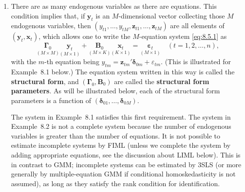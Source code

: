 \begin{enumerate}
\item There are as many endogenous variables as there are equations. This condition
  implies that, if $\mathbf{y}_t$ is an $M$-dimensional vector collecting those $M$ endogenous
  variables, then $(y_{t1}, \ldots, y_{tM}, \mathbf{z}_{t1}, \ldots, \mathbf{z}_{tM})$ are all elements of
  $(\mathbf{y}_t, \mathbf{x}_t)$, which
  allows one to write the $M$-equation system \eqref{eq:8.5.1} as
  \begin{equation}
    \underset{(M \times M)}{\boldsymbol{\Gamma}_0}
    \underset{(M \times 1)}{\mathbf{y}_t}
    + \underset{(M \times K)}{\mathbf{B}_0}
    \underset{(K \times 1)}{\mathbf{x}_t}
    = \underset{(M \times 1)}{\boldsymbol{\varepsilon}_t}
    \quad (t = 1, 2, \ldots, n),
    \label{eq:8.5.8} \tag{8.5.8}
  \end{equation}
  with the $m$-th equation being
  $y_{tm} = \mathbf{z}_{tm}'\boldsymbol{\delta}_{0m} + \varepsilon_{tm}$. (This is illustrated for
  Example~8.1 below.) The equation system written in this way is called the
  \textbf{structural form}, and $(\boldsymbol{\Gamma}_0, \mathbf{B}_0)$ are called the \textbf{structural form parameters}. As
  will be illustrated below, each of the structural form parameters is a function of
  $(\boldsymbol{\delta}_{01}, \ldots, \boldsymbol{\delta}_{0M})$.

  The system in Example~8.1 satisfies this first requirement. The system in
  Example~8.2 is not a complete system because the number of endogenous variables is greater than the number of equations. It is not possible to estimate
  incomplete systems by FIML (unless we complete the system by adding appropriate equations, see the discussion about LIML below). This is in contrast to
  GMM; incomplete systems can be estimated by 3SLS (or more generally by
  multiple-equation GMM if conditional homoskedasticity is not assumed), as
  long as they satisfy the rank condition for identification.


\end{enumerate}
